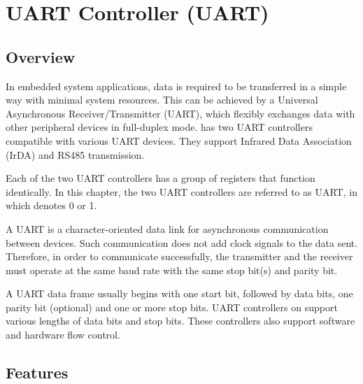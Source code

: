 \documentclass[main\_\_EN.tex]{subfiles}
\begin{document}

\ifglobal
\else
    {\let\clearpage\relax \listoftodos}
    {\let\clearpage\relax \listofdonetodos}
    \tableofcontents
\fi



\hypertarget{uart}{}
\chapter{UART Controller (UART)}
\label{mod:uart}


\section{Overview}

In embedded system applications, data is required to be transferred in a simple way with minimal system resources. This can be achieved by a Universal Asynchronous Receiver/Transmitter (UART), which flexibly exchanges data with other peripheral devices in full-duplex mode. \chipname{} has two UART controllers compatible with various UART devices. They support Infrared Data Association (IrDA) and RS485 transmission.

Each of the two UART controllers has a group of registers that function identically. In this chapter, the two UART controllers are referred to as UART, in which  denotes 0 or 1.

A UART is a character-oriented data link for asynchronous communication between devices. Such communication does not add clock signals to the data sent. Therefore, in order to communicate successfully, the transmitter and the receiver must operate at the same baud rate with the same stop bit(s) and parity bit.

A UART data frame usually begins with one start bit, followed by data bits, one parity bit (optional) and one or more stop bits. UART controllers on \chipname{} support various lengths of data bits and stop bits. These controllers also support software and hardware flow control.

\section{Features}
\end{document}
